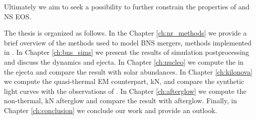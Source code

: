Ultimately we aim to seek a possibility to further constrain the properties 
of \GW{} and \ac{NS} \ac{EOS}.




The thesis is organized as follows.
%
In the Chapter \ref{ch:nr_methods} we provide a brief overview 
of the methods used to model \ac{BNS} mergers, methods implemented in \wisky{}.
%
In Chapter \ref{ch:bns_sims} we present the results of simulation 
postprocessing and discuss the \pmerg{} dynamics and ejecta.
%
In Chapter \ref{ch:nucleo} we compute the \rproc{} \nuc{} 
in the ejecta and compare the result with solar abundances.
%
In Chapter \ref{ch:kilonova} we compute the quasi-thermal 
\ac{EM} counterpart, \ac{kN}, and compare the synthetic 
light curves with the observations of \AT{}.
%
In Chapter \ref{ch:afterglow} we compute the non-thermal, 
\ac{kN} afterglow and compare the result with \GRB{} afterglow.
%
Finally, in Chapter \ref{ch:conclusion} 
we conclude our work and provide an outlook.